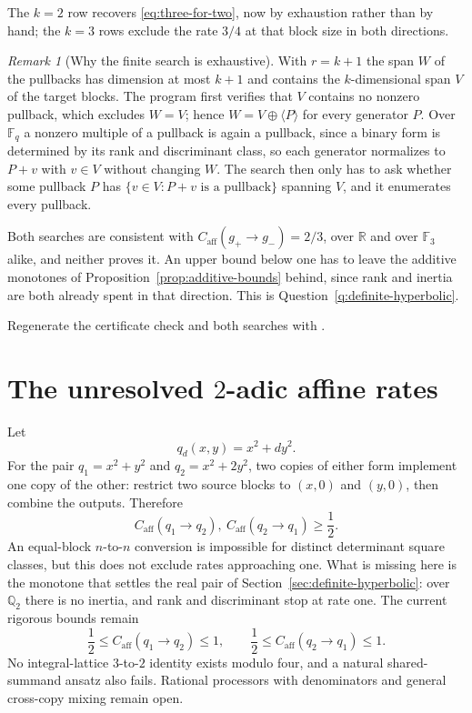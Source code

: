 \documentclass[11pt]{article}
\theoremstyle{definition}
\theoremstyle{plain}
\theoremstyle{remark}
\newtheorem{remark}[definition]{Remark}
\newcommand{\F}{\mathbb F}
\newcommand{\Q}{\mathbb Q}
\newcommand{\R}{\mathbb R}
\newcommand{\caff}{C_{\mathrm{aff}}}
\begin{document}
The \(k=2\) row recovers \eqref{eq:three-for-two}, now by exhaustion rather
than by hand; the \(k=3\) rows exclude the rate \(3/4\) at that block size in
both directions.

\begin{remark}[Why the finite search is exhaustive]
With \(r=k+1\) the span \(W\) of the pullbacks has dimension at most \(k+1\)
and contains the \(k\)-dimensional span \(V\) of the target blocks.  The
program first verifies that \(V\) contains no nonzero pullback, which excludes
\(W=V\); hence \(W=V\oplus\langle P\rangle\) for every generator \(P\).  Over
\(\F_q\) a nonzero multiple of a pullback is again a pullback, since a binary
form is determined by its rank and discriminant class, so each generator
normalizes to \(P+v\) with \(v\in V\) without changing \(W\).  The search then
only has to ask whether some pullback \(P\) has
\(\{v\in V:P+v\text{ is a pullback}\}\) spanning \(V\), and it enumerates
every pullback.
\end{remark}

Both searches are consistent with
\(\caff(g_+\to g_-)=2/3\), over \(\R\) and over \(\F_3\) alike, and neither
proves it.  An upper bound below one has to leave the additive monotones of
Proposition~\ref{prop:additive-bounds} behind, since rank and inertia are both
already spent in that direction.  This is
Question~\ref{q:definite-hyperbolic}.

Regenerate the certificate check and both searches with
.

\section{The unresolved \texorpdfstring{\(2\)-adic}{2-adic} affine rates}
\label{sec:q2-rates}

Let
\[
  q_d(x,y)=x^2+d y^2.
\]
For the pair \(q_1=x^2+y^2\) and \(q_2=x^2+2y^2\), two copies of either form
implement one copy of the other: restrict two source blocks to \((x,0)\) and
\((y,0)\), then combine the outputs.  Therefore
\[
  \caff(q_1\to q_2),\ \caff(q_2\to q_1)\ge\frac12.
\]
An equal-block \(n\)-to-\(n\) conversion is impossible for distinct
determinant square classes, but this does not exclude rates approaching one.  What is missing here is the
monotone that settles the real pair of Section~\ref{sec:definite-hyperbolic}:
over \(\Q_2\) there is no inertia, and rank and discriminant stop at rate
one.
The current rigorous bounds remain
\[
  \frac12\le\caff(q_1\to q_2)\le1,
  \qquad
  \frac12\le\caff(q_2\to q_1)\le1.
\]
No integral-lattice \(3\)-to-\(2\) identity exists modulo four, and a natural
shared-summand ansatz also fails.  Rational processors with denominators and
general cross-copy mixing remain open.
\end{document}
